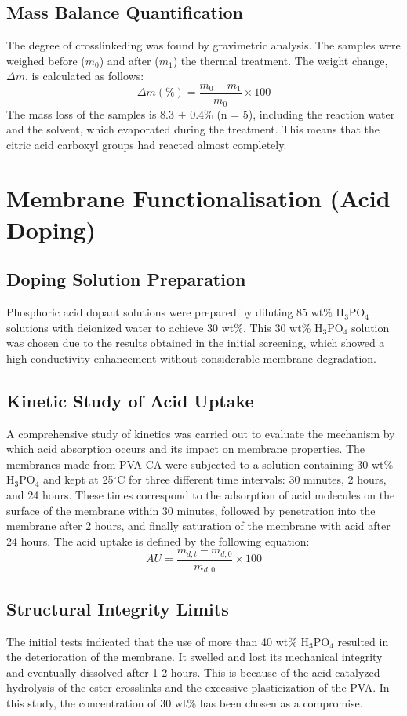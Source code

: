 \documentclass[12pt,a4paper]{report}
\begin{document}
\subsection{Mass Balance Quantification}
The degree of crosslinkeding was found by gravimetric analysis. The samples were weighed before (\(m_0\)) and after (\(m_1\)) the thermal treatment. The weight change, \(\Delta m\), is calculated as follows:
\[
\Delta m(\%) = \frac{m_0 - m_1}{m_0} \times 100 \tag{3.2}
\]
The mass loss of the samples is 8.3 \(\pm\) 0.4\% (n = 5), including the reaction water and the solvent, which evaporated during the treatment. This means that the citric acid carboxyl groups had reacted almost completely. \cite{53, 54}

\section{Membrane Functionalisation (Acid Doping)}
\subsection{Doping Solution Preparation}
Phosphoric acid dopant solutions were prepared by diluting 85 wt\% H\(_3\)PO\(_4\) solutions with deionized water to achieve 30 wt\%. This 30 wt\% H\(_3\)PO\(_4\) solution was chosen due to the results obtained in the initial screening, which showed a high conductivity enhancement without considerable membrane degradation.\cite{56,57}

\subsection{Kinetic Study of Acid Uptake}
A comprehensive study of kinetics was carried out to evaluate the mechanism by which acid absorption occurs and its impact on membrane properties. The membranes made from PVA-CA were subjected to a solution containing 30 wt\% H\(_3\)PO\(_4\) and kept at 25\(^\circ\)C for three different time intervals: 30 minutes, 2 hours, and 24 hours. These times correspond to the adsorption of acid molecules on the surface of the membrane within 30 minutes, followed by penetration into the membrane after 2 hours, and finally saturation of the membrane with acid after 24 hours.\cite{35,52} The acid uptake is defined by the following equation:
\[
AU = \frac{m_{d,t}-m_{d,0}}{m_{d,0}} \times 100 \tag{3.3}
\]

\subsection{Structural Integrity Limits}
The initial tests indicated that the use of more than 40 wt\% H\(_3\)PO\(_4\) resulted in the deterioration of the membrane. It swelled and lost its mechanical integrity and eventually dissolved after 1-2 hours. This is because of the acid-catalyzed hydrolysis of the ester crosslinks and the excessive plasticization of the PVA.\cite{35,58} In this study, the concentration of 30 wt\% has been chosen as a compromise.
\end{document}
